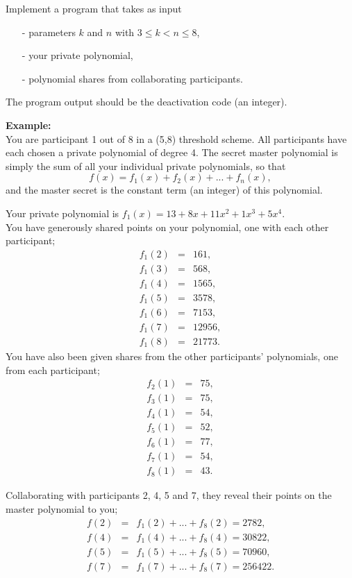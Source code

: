 \documentclass{article}
\begin{document}
\begin{description}
{			Implement a program that takes as input
			\begin{itemize}
				\item[-] parameters $k$ and $n$ with $3\leq k<n\leq 8$,
				\item[-] your private polynomial,
				\item[-] polynomial shares from collaborating participants.
			\end{itemize}
			The program output should be the deactivation code (an integer).
			
			\textbf{Example:}\\
			You are participant 1 out of 8 in a (5,8) threshold scheme.
			All participants have each chosen a private polynomial of degree 4.
			The secret master polynomial is simply the sum of all your individual private polynomials, so that
			\[f(x) = f_{1}(x) + f_{2}(x) + ... + f_{n}(x),\]
			and the master secret is the constant term (an integer) of this polynomial.
			
			Your private polynomial is $f_{1}(x) = 13 +  8x + 11x^2 +  1x^3 +  5x^4$.\\
			You have generously shared points on your polynomial, one with each other participant;
			\begin{eqnarray*}
				f_{1}(2) &=& 161,\\
				f_{1}(3) &=& 568,\\
				f_{1}(4) &=& 1565,\\
				f_{1}(5) &=& 3578,\\
				f_{1}(6) &=& 7153,\\
				f_{1}(7) &=& 12956,\\
				f_{1}(8) &=& 21773.
			\end{eqnarray*}
			You have also been given shares from the other participants' polynomials, one from each participant;
			\begin{eqnarray*}
				f_{2}(1) &=& 75,\\
				f_{3}(1) &=& 75,\\
				f_{4}(1) &=& 54,\\
				f_{5}(1) &=& 52,\\
				f_{6}(1) &=& 77,\\
				f_{7}(1) &=& 54,\\
				f_{8}(1) &=& 43.
			\end{eqnarray*}
			
			Collaborating with participants 2, 4, 5 and 7, they reveal their points on the master polynomial to you;
			\begin{eqnarray*}
				f(2) &=& f_{1}(2) + ... + f_{8}(2) = 2782,\\
				f(4) &=& f_{1}(4) + ... + f_{8}(4) = 30822,\\
				f(5) &=& f_{1}(5) + ... + f_{8}(5) = 70960,\\
				f(7) &=& f_{1}(7) + ... + f_{8}(7) = 256422.
			\end{eqnarray*}
			
}
\end{description}
\end{document}
